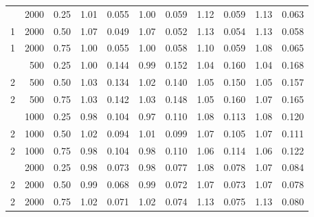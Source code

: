 \begin{table}[t]
\begin{tabular}{rrr rr rr rr rr}
\addlinespace
1 & 2000 & 0.25 & 1.01 & 0.055 & 1.00 & 0.059 & 1.12 & 0.059 & 1.13 & 0.063 \\
1 & 2000 & 0.50 & 1.07 & 0.049 & 1.07 & 0.052 & 1.13 & 0.054 & 1.13 & 0.058 \\
1 & 2000 & 0.75 & 1.00 & 0.055 & 1.00 & 0.058 & 1.10 & 0.059 & 1.08 & 0.065 \\
\addlinespace
2 & 500 & 0.25 & 1.00 & 0.144 & 0.99 & 0.152 & 1.04 & 0.160 & 1.04 & 0.168 \\
2 & 500 & 0.50 & 1.03 & 0.134 & 1.02 & 0.140 & 1.05 & 0.150 & 1.05 & 0.157 \\
2 & 500 & 0.75 & 1.03 & 0.142 & 1.03 & 0.148 & 1.05 & 0.160 & 1.07 & 0.165 \\
\addlinespace
2 & 1000 & 0.25 & 0.98 & 0.104 & 0.97 & 0.110 & 1.08 & 0.113 & 1.08 & 0.120 \\
2 & 1000 & 0.50 & 1.02 & 0.094 & 1.01 & 0.099 & 1.07 & 0.105 & 1.07 & 0.111 \\
2 & 1000 & 0.75 & 0.98 & 0.104 & 0.98 & 0.110 & 1.06 & 0.114 & 1.06 & 0.122 \\
\addlinespace
2 & 2000 & 0.25 & 0.98 & 0.073 & 0.98 & 0.077 & 1.08 & 0.078 & 1.07 & 0.084 \\
2 & 2000 & 0.50 & 0.99 & 0.068 & 0.99 & 0.072 & 1.07 & 0.073 & 1.07 & 0.078 \\
2 & 2000 & 0.75 & 1.02 & 0.071 & 1.02 & 0.074 & 1.13 & 0.075 & 1.13 & 0.080 \\
\bottomrule\end{tabular}\end{table}
